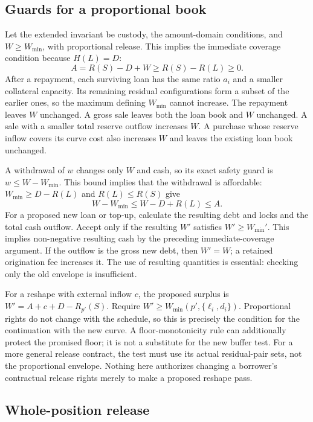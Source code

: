 \subsection{Guards for a proportional book}\label{cr:guards}

Let the extended invariant be custody, the amount-domain conditions, and $W\ge W_{\min}$, with proportional release. This implies the immediate coverage condition because $H(L)=D$:
\[
A=R(S)-D+W\ge R(S)-R(L)\ge0.
\]
After a repayment, each surviving loan has the same ratio $a_i$ and a smaller collateral capacity. Its remaining residual configurations form a subset of the earlier ones, so the maximum defining $W_{\min}$ cannot increase. The repayment leaves $W$ unchanged. A gross sale leaves both the loan book and $W$ unchanged. A sale with a smaller total reserve outflow increases $W$. A purchase whose reserve inflow covers its curve cost also increases $W$ and leaves the existing loan book unchanged.

A withdrawal of $w$ changes only $W$ and cash, so its exact safety guard is $w\le W-W_{\min}$. This bound implies that the withdrawal is affordable: $W_{\min}\ge D-R(L)$ and $R(L)\le R(S)$ give
\[
W-W_{\min}\le W-D+R(L)\le A.
\]
For a proposed new loan or top-up, calculate the resulting debt and locks and the total cash outflow. Accept only if the resulting $W'$ satisfies $W'\ge W_{\min}'$. This implies non-negative resulting cash by the preceding immediate-coverage argument. If the outflow is the gross new debt, then $W'=W$; a retained origination fee increases it. The use of resulting quantities is essential: checking only the old envelope is insufficient.

For a reshape with external inflow $c$, the proposed surplus is $W'=A+c+D-R_{p'}(S)$. Require $W'\ge W_{\min}(p',\{\ell_i,d_i\})$. Proportional rights do not change with the schedule, so this is precisely the condition for the continuation with the new curve. A floor-monotonicity rule can additionally protect the promised floor; it is not a substitute for the new buffer test. For a more general release contract, the test must use its actual residual-pair sets, not the proportional envelope. Nothing here authorizes changing a borrower's contractual release rights merely to make a proposed reshape pass.

\subsection{Whole-position release}\label{sec:whole}

